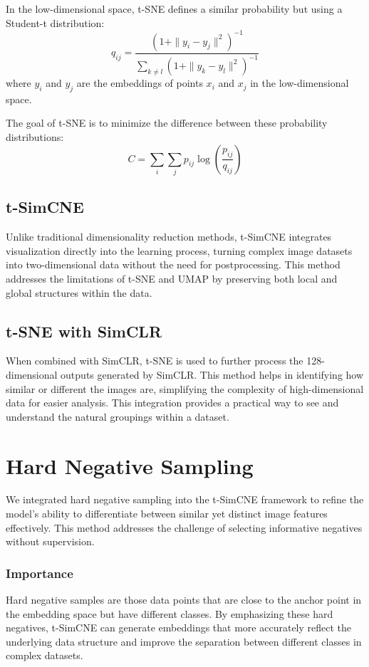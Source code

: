 In the low-dimensional space, t-SNE defines a similar probability but using a Student-t distribution:
\[
q_{ij} = \frac{(1 + \|y_i - y_j\|^2)^{-1}}{\sum_{k \neq l} (1 + \|y_k - y_l\|^2)^{-1}}
\]
where \(y_i\) and \(y_j\) are the embeddings of points \(x_i\) and \(x_j\) in the low-dimensional space.

The goal of t-SNE is to minimize the difference between these probability distributions:
\[
C = \sum_i \sum_j p_{ij} \log\left(\frac{p_{ij}}{q_{ij}}\right)
\]

\subsection{t-SimCNE}
Unlike traditional dimensionality reduction methods, t-SimCNE integrates visualization directly into the learning process, turning complex image datasets into two-dimensional data without the need for postprocessing. This method addresses the limitations of t-SNE and UMAP by preserving both local and global structures within the data.

\subsection{t-SNE with SimCLR}
When combined with SimCLR, t-SNE is used to further process the 128-dimensional outputs generated by SimCLR. This method helps in identifying how similar or different the images are, simplifying the complexity of high-dimensional data for easier analysis. This integration provides a practical way to see and understand the natural groupings within a dataset.


\section{Hard Negative Sampling}
We integrated hard negative sampling into the t-SimCNE framework to refine the model's ability to differentiate between similar yet distinct image features effectively. This method addresses the challenge of selecting informative negatives without supervision.

\subsubsection{Importance}
Hard negative samples are those data points that are close to the anchor point in the embedding space but have different classes. By emphasizing these hard negatives, t-SimCNE can generate embeddings that more accurately reflect the underlying data structure and improve the separation between different classes in complex datasets.

